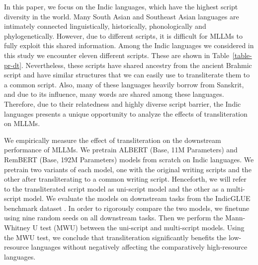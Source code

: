 \documentclass[11pt]{article}
\begin{document}
In this paper, we focus on the Indic languages, which have the highest script diversity in the world. Many South Asian and Southeast Asian languages are intimately connected linguistically, historically, phonologically \citep{littell-etal-2017-uriel} and phylogenetically. However, due to different scripts, it is difficult for MLLMs to fully exploit this shared information. Among the Indic languages we considered in this study we encounter eleven different scripts. These are shown in Table~\ref{table-pr-dt}. Nevertheless, these scripts have shared ancestry from the ancient Brahmic script \citep{Hockett1997, Coningham1996} and have similar structures that we can easily use to transliterate them to a common script. Also, many of these languages heavily borrow from Sanskrit, and due to its influence, many words are shared among these languages. Therefore, due to their relatedness and highly diverse script barrier, the Indic languages presents a unique opportunity to analyze the effects of transliteration on MLLMs. 

We empirically measure the effect of transliteration on the downstream performance of MLLMs. We pretrain ALBERT (Base, 11M Parameters) \citep{Lan2020ALBERTAL} and RemBERT (Base, 192M Parameters) \citep{Chung2021RethinkingEC} models from scratch on Indic languages. We pretrain two variants of each model, one with the original writing scripts and the other after transliterating to a common writing script. Henceforth, we will refer to the transliterated script model as uni-script model and the other as a multi-script model. We evaluate the models on downstream tasks from the IndicGLUE benchmark dataset \citep{kakwani-etal-2020-indicnlpsuite}. In order to rigorously compare the two models, we finetune using nine random seeds on all downstream tasks. Then we perform the Mann-Whitney U test (MWU) between the uni-script and multi-script models. Using the MWU test, we conclude that transliteration significantly benefits the low-resource languages without negatively affecting the comparatively high-resource languages.
\end{document}
